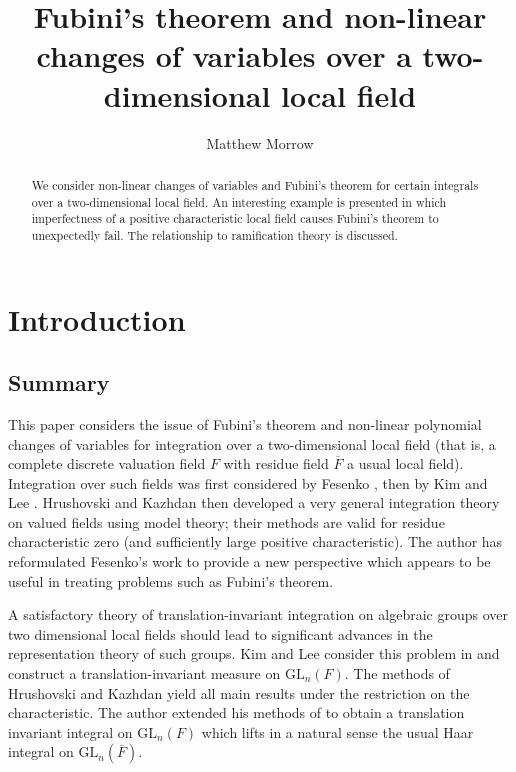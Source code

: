 \documentclass{lmsMODIFIED}
\title[Fubini's theorem over a two-dimensional local field]{Fubini's theorem and non-linear changes of variables over a two-dimensional local field}
\author{Matthew Morrow}
\newcommand{\res}[1]{\overline{#1}}
\begin{document}
\maketitle

\begin{abstract}
We consider non-linear changes of variables and Fubini's theorem for certain integrals over a two-dimensional local field. An interesting example is presented in which imperfectness of a positive characteristic local field causes Fubini's theorem to unexpectedly fail. The relationship to ramification theory is discussed.
\end{abstract}

\section{Introduction}

\subsection{Summary}
This paper considers the issue of Fubini's theorem and non-linear polynomial changes of variables for integration over a two-dimensional local field (that is, a complete discrete valuation field $F$ with residue field $\res{F}$ a usual local field). Integration over such fields was first considered by Fesenko \cite{Fesenko2003}, then by Kim and Lee \cite{Lee2005}. Hrushovski and Kazhdan \cite{Hrushovski2006} \cite{Hrushovski2008} then developed a very general integration theory on valued fields using model theory; their methods are valid for residue characteristic zero (and sufficiently large positive characteristic). The author \cite{Morrow2008} has reformulated Fesenko's work to provide a new perspective which appears to be useful in treating problems such as Fubini's theorem.

A satisfactory theory of translation-invariant integration on algebraic groups over two dimensional local fields should lead to significant advances in the representation theory of such groups. Kim and Lee consider this problem in \cite{Lee2005} and construct a translation-invariant measure on $\mbox{GL}_n(F)$. The methods of Hrushovski and Kazhdan yield all main results under the restriction on the characteristic. The author extended \cite{Morrow2008a} his methods of \cite{Morrow2008} to obtain a translation invariant integral on $\mbox{GL}_n(F)$ which lifts in a natural sense the usual Haar integral on $\mbox{GL}_n(\res{F})$.
\end{document}
